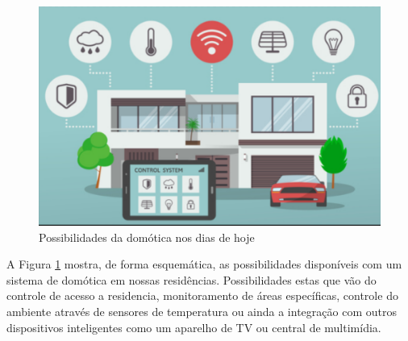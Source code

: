 \begin{figure}[H]
\caption{\label{domotica} Possibilidades da domótica nos dias de hoje}
\includegraphics[scale=0.20]{img/casa-conectada.png}
\end{figure}

 A Figura \ref{domotica} mostra, de forma esquemática, as possibilidades disponíveis com um sistema de domótica em nossas residências. Possibilidades estas que vão do controle de acesso a residencia, monitoramento de áreas específicas, controle do ambiente através de sensores de temperatura ou ainda a integração com outros dispositivos inteligentes como um aparelho de TV ou central de multimídia.
